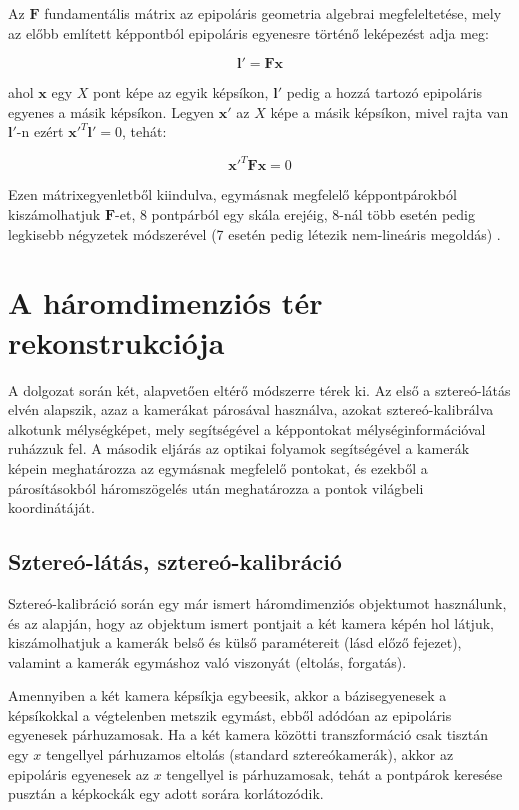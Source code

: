 Az $\mathbf{F}$ fundamentális mátrix az epipoláris geometria algebrai megfeleltetése, mely az előbb említett képpontból epipoláris egyenesre történő leképezést adja meg:

\[\mathbf{l}' = \mathbf{F}\mathbf{x}\]

ahol $\mathbf{x}$ egy $X$ pont képe az egyik képsíkon, $\mathbf{l}'$ pedig a hozzá tartozó epipoláris egyenes a másik képsíkon. Legyen $\mathbf{x}'$ az $X$ képe a másik képsíkon, mivel rajta van $\mathbf{l}'$-n ezért $\mathbf{x}'^T \mathbf{l}' = 0$, tehát:

\[\mathbf{x}'^T\mathbf{F}\mathbf{x} = 0\]

Ezen mátrixegyenletből kiindulva, egymásnak megfelelő képpontpárokból kiszámolhatjuk $\mathbf{F}$-et, 8 pontpárból egy skála erejéig, 8-nál több esetén pedig legkisebb négyzetek módszerével (7 esetén pedig létezik nem-lineáris megoldás) \cite[10.1 alfejezet]{HZ}.

\section{A háromdimenziós tér rekonstrukciója \label{sec:methods}}


A dolgozat során két, alapvetően eltérő módszerre térek ki. Az első a sztereó-látás elvén alapszik, azaz a kamerákat párosával használva, azokat sztereó-kalibrálva alkotunk mélységképet, mely segítségével a képpontokat mélységinformációval ruházzuk fel. A második eljárás az optikai folyamok segítségével a kamerák képein meghatározza az egymásnak megfelelő pontokat, és ezekből a párosításokból háromszögelés után meghatározza a pontok világbeli koordinátáját.

\subsection{Sztereó-látás, sztereó-kalibráció}

Sztereó-kalibráció \cite{camera-calib-3d} során egy már ismert háromdimenziós objektumot használunk, és az alapján, hogy az objektum ismert pontjait a két kamera képén hol látjuk, kiszámolhatjuk a kamerák belső és külső paramétereit (lásd előző fejezet), valamint a kamerák egymáshoz való viszonyát (eltolás, forgatás). 

Amennyiben a két kamera képsíkja egybeesik, akkor a bázisegyenesek a képsíkokkal a végtelenben metszik egymást, ebből adódóan az epipoláris egyenesek párhuzamosak. Ha a két kamera közötti transzformáció csak tisztán egy $x$ tengellyel párhuzamos eltolás (standard sztereókamerák), akkor az epipoláris egyenesek az $x$ tengellyel is párhuzamosak, tehát a pontpárok keresése pusztán a képkockák egy adott sorára korlátozódik.

